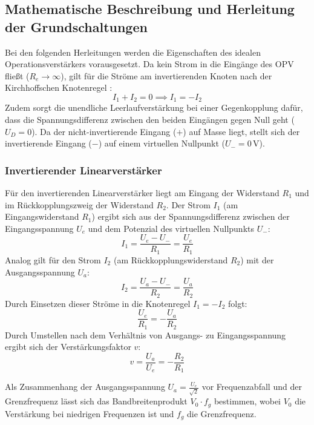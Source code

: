 \subsection{Mathematische Beschreibung und Herleitung der Grundschaltungen}
 
Bei den folgenden Herleitungen werden die Eigenschaften des idealen Operationsverstärkers vorausgesetzt. Da kein Strom in die Eingänge des OPV fließt ($R_e \to \infty$), gilt für die Ströme am invertierenden Knoten nach der Kirchhoffschen Knotenregel \cite{demtroeder2}:
\begin{equation}
    I_1 + I_2 = 0 \implies I_1 = -I_2
\end{equation}
Zudem sorgt die unendliche Leerlaufverstärkung bei einer Gegenkopplung dafür, dass die Spannungsdifferenz zwischen den beiden Eingängen gegen Null geht ($U_D = 0$). Da der nicht-invertierende Eingang ($+$) auf Masse liegt, stellt sich der invertierende Eingang ($-$) auf einem virtuellen Nullpunkt ($U_- = 0\,\text{V}$).

\subsubsection{Invertierender Linearverstärker}
Für den invertierenden Linearverstärker liegt am Eingang der Widerstand $R_1$ und im Rückkopplungszweig der Widerstand $R_2$. 
Der Strom $I_1$ (am Eingangswiderstand $R_1$) ergibt sich aus der Spannungsdifferenz zwischen der Eingangsspannung $U_e$ und dem Potenzial des virtuellen Nullpunkts $U_-$:
\begin{equation*}
    I_1 = \frac{U_e - U_-}{R_1} = \frac{U_e}{R_1}
\end{equation*}
Analog gilt für den Strom $I_2$ (am Rückkopplungswiderstand $R_2$) mit der Ausgangsspannung $U_a$:
\begin{equation*}
    I_2 = \frac{U_a - U_-}{R_2} = \frac{U_a}{R_2}
\end{equation*}
Durch Einsetzen dieser Ströme in die Knotenregel $I_1 = -I_2$ folgt:
\begin{equation*}
    \frac{U_e}{R_1} = -\frac{U_a}{R_2}
\end{equation*}
Durch Umstellen nach dem Verhältnis von Ausgangs- zu Eingangsspannung ergibt sich der Verstärkungsfaktor $v$:
\begin{equation}
    v = \frac{U_a}{U_e} = -\frac{R_2}{R_1}
\end{equation}

Als Zusammenhang der Ausgangsspannung $U_a = \frac{U_e}{\sqrt{2}}$ vor Frequenzabfall und der Grenzfrequenz lässt sich  
das Bandbreitenprodukt $V_0 \cdot f_g$ bestimmen, wobei $V_0$ die Verstärkung bei niedrigen Frequenzen ist und $f_g$ die Grenzfrequenz.

